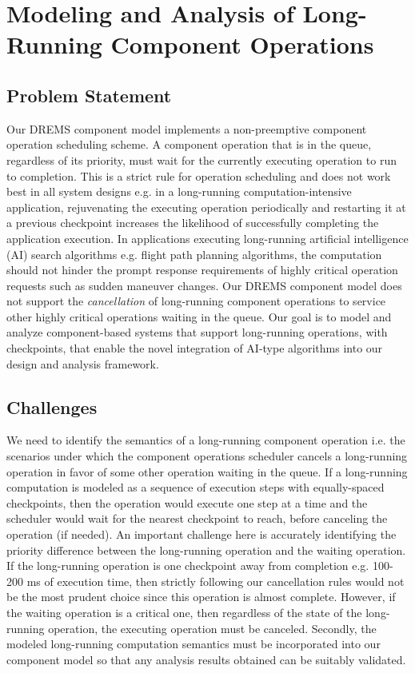 \newpage
\section{Modeling and Analysis of Long-Running Component Operations}

\subsection{Problem Statement}

Our DREMS component model implements a non-preemptive component operation scheduling scheme. A component operation that is in the queue, regardless of its priority, must wait for the currently executing operation to run to completion. This is a strict rule for operation scheduling and does not work best in all system designs e.g. in a long-running computation-intensive application, rejuvenating the executing operation periodically and restarting it at a previous checkpoint increases the likelihood of successfully completing the application execution. In applications executing long-running artificial intelligence (AI) search algorithms e.g. flight path planning algorithms, the computation should not hinder the prompt response requirements of highly critical operation requests such as sudden maneuver changes. Our DREMS component model does not support the \emph{cancellation} of long-running component operations to service other highly critical operations waiting in the queue. Our goal is to model and analyze component-based systems that support long-running operations, with checkpoints, that enable the novel integration of AI-type algorithms into our design and analysis framework. 

\subsection{Challenges}

We need to identify the semantics of a long-running component operation i.e. the scenarios under which the component operations scheduler cancels a long-running operation in favor of some other operation waiting in the queue. If a long-running computation is modeled as a sequence of execution steps with equally-spaced checkpoints, then the operation would execute one step at a time and the scheduler would wait for the nearest checkpoint to reach, before canceling the operation (if needed). An important challenge here is accurately identifying the priority difference between the long-running operation and the waiting operation. If the long-running operation is one checkpoint away from completion e.g. 100-200 ms of execution time, then strictly following our cancellation rules would not be the most prudent choice since this operation is almost complete. However, if the waiting operation is a critical one, then regardless of the state of the long-running operation, the executing operation must be canceled. Secondly, the modeled long-running computation semantics must be incorporated into our component model so that any analysis results obtained can be suitably validated. 

